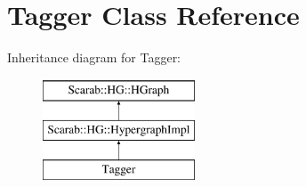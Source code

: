 \hypertarget{classTagger}{
\section{Tagger Class Reference}
\label{classTagger}
}
Inheritance diagram for Tagger:\begin{figure}[H]
\begin{center}
\leavevmode
\includegraphics[height=3cm]{classTagger}
\end{center}
\end{figure}
